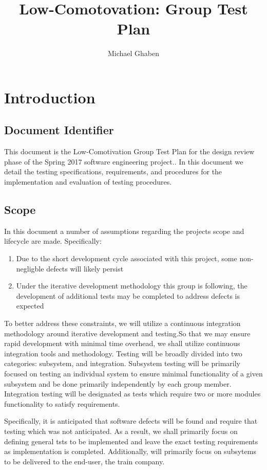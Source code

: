 \documentclass[]{article}
\title{Low-Comotovation: Group Test Plan}
\author{Michael Ghaben}
\date{}
\begin{document}
\maketitle
\tableofcontents
\titlepage
\section{Introduction}
\subsection{Document Identifier}
This document is the Low-Comotivation Group Test Plan for the design review phase of the Spring 2017 software engineering project.. In this document we detail the testing specifications, requirements, and procedures for the implementation and evaluation of testing procedures.

\subsection{Scope}
In this document a number of assumptions regarding the projects scope and lifecycle are made. Specifically:

\begin{enumerate}
	\item Due to the short development cycle associated with this project, some non-negligble defects will likely persist
	\item Under the iterative development methodology this group is following, the development of additional tests may be completed to address defects is expected
\end{enumerate}
To better address these constraints, we will utilize a continuous integration methodology around iterative development and testing.So that we may ensure rapid development with minimal time overhead, we shall utilize continuous integration tools and methodology. Testing will be broadly divided into two categories: subsystem, and integration. Subsystem testing will be primarily focused on testing an individual system to ensure minimal functionality of a given subsystem and be done primarily independently by each group member. Integration testing will be designated as tests which require two or more modules functionality to satisfy requirements.

Specifically, it is anticipated that software defects will be found and require that testing which was not anticipated. As a result, we shall primarily focus on defining general tsts to be implemented and leave the exact testing requirements as implementation is completed. Additionally, will primarily focus on subsytems to be delivered to the end-user, the train company.
\end{document}
